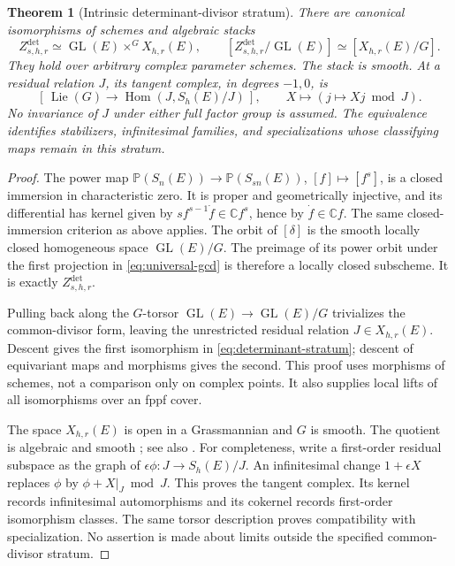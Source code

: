 \documentclass[11pt,reqno]{amsart}
\numberwithin{equation}{section}
\newtheorem{theorem}{Theorem}[section]
\theoremstyle{definition}\newtheorem{definition}[theorem]{Definition}
\theoremstyle{remark}\newtheorem{remark}[theorem]{Remark}
\newcommand{\C}{\mathbb C}\newcommand{\Q}{\mathbb Q}
\newcommand{\Pj}{\mathbb P}\newcommand{\A}{\mathbb A}
\DeclareMathOperator{\Hom}{Hom}\DeclareMathOperator{\Tot}{Tot}
\begin{document}
\begin{theorem}[Intrinsic determinant-divisor stratum]
\label{thm:determinant-stratum}
There are canonical isomorphisms of schemes and algebraic stacks
\begin{equation}\label{eq:determinant-stratum}
 Z^{\det}_{s,h,r}\simeq
 \operatorname{GL}(E)\times^G X_{h,r}(E),\qquad
 [Z^{\det}_{s,h,r}/\operatorname{GL}(E)]\simeq[X_{h,r}(E)/G].
\end{equation}
They hold over arbitrary complex parameter schemes.  The stack is
smooth.  At a residual relation \(J\), its tangent complex, in degrees
\(-1,0\), is
\begin{equation}\label{eq:ambient-tangent-complex}
 [\,\operatorname{Lie}(G)\longrightarrow
                    \Hom(J,S_h(E)/J)\,],
             \qquad X\longmapsto(j\mapsto Xj\bmod J).
\end{equation}
No invariance of \(J\) under either full factor group is assumed.
The equivalence identifies stabilizers, infinitesimal families, and
specializations whose classifying maps remain in this stratum.
\end{theorem}
\begin{proof}
The power map \(\Pj(S_n(E))\to\Pj(S_{sn}(E))\),
\([f]\mapsto[f^s]\), is a closed immersion in characteristic zero.
It is proper and geometrically injective, and its differential has
kernel given by \(sf^{s-1}\dot f\in\C f^s\), hence by
\(\dot f\in\C f\).  The same closed-immersion criterion as above
applies.  The orbit of \([\delta]\) is the smooth locally closed
homogeneous space \(\operatorname{GL}(E)/G\).  The preimage of its
power orbit under the first projection in
\eqref{eq:universal-gcd} is therefore a locally closed subscheme.
It is exactly \(Z^{\det}_{s,h,r}\).

Pulling back along the \(G\)-torsor
\(\operatorname{GL}(E)\to\operatorname{GL}(E)/G\) trivializes the
common-divisor form, leaving the unrestricted residual relation
\(J\in X_{h,r}(E)\).  Descent gives the first isomorphism in
\eqref{eq:determinant-stratum}; descent of equivariant maps and
morphisms gives the second.  This proof uses morphisms of schemes,
not a comparison only on complex points.  It also supplies local
lifts of all isomorphisms over an fppf cover.

The space \(X_{h,r}(E)\) is open in a Grassmannian and \(G\) is
smooth.  The quotient is algebraic and smooth
\cite[Theorem~97.17.2]{StacksQuotient}; see also
\cite[Lemma~101.33.7]{StacksSmoothQuotient}.
For completeness, write a first-order residual subspace as the
graph of \(\epsilon\phi:J\to S_h(E)/J\).  An infinitesimal change
\(1+\epsilon X\) replaces \(\phi\) by \(\phi+X|_J\bmod J\).
This proves the tangent complex.  Its kernel records infinitesimal
automorphisms and its cokernel records first-order isomorphism
classes.  The same torsor description proves compatibility with
specialization.  No assertion is made about limits outside the
specified common-divisor stratum.
\end{proof}
\end{document}
